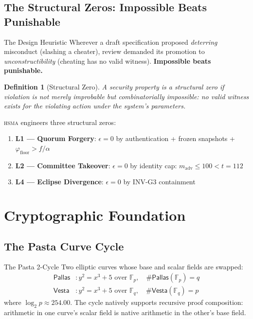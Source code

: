 \documentclass[11pt, a4paper]{article}
\newtheorem{definition}{Definition}
\newcommand{\hsma}{\textsc{hsma}}
\begin{document}
\subsection{The Structural Zeros: Impossible Beats Punishable}

\begin{keybox}{The Design Heuristic}
Wherever a draft specification proposed \emph{deterring} misconduct
(slashing a cheater), review demanded its promotion to
\emph{unconstructibility} (cheating has no valid witness).
\textbf{Impossible beats punishable.}
\end{keybox}

\begin{definition}[Structural Zero]
A security property is a \emph{structural zero} if violation is not
merely improbable but \emph{combinatorially impossible}: no valid
witness exists for the violating action under the system's parameters.
\end{definition}

\hsma{} engineers three structural zeros:
\begin{enumerate}
\item \textbf{L1 — Quorum Forgery}: $\epsilon = 0$ by authentication + frozen snapshots + $\varphi_{\text{floor}} > f/\alpha$ \item \textbf{L2 — Committee Takeover}: $\epsilon = 0$ by identity cap: $m_{\text{adv}} \le 100 < t = 112$ \item \textbf{L4 — Eclipse Divergence}: $\epsilon = 0$ by INV-G3 containment
\end{enumerate}

\section{Cryptographic Foundation}
\label{sec:foundation}

\subsection{The Pasta Curve Cycle}

\begin{defnbox}{The Pasta 2-Cycle}
Two elliptic curves whose base and scalar fields are swapped:
\begin{align}
\textsf{Pallas}&: y^2 = x^3 + 5 \text{ over } \mathbb{F}_p, \quad
\#\textsf{Pallas}(\mathbb{F}_p) = q\\
\textsf{Vesta}&: y^2 = x^3 + 5 \text{ over } \mathbb{F}_q, \quad
\#\textsf{Vesta}(\mathbb{F}_q) = p
\end{align}
where $\log_2 p \approx 254.00$. The cycle natively supports recursive
proof composition: arithmetic in one curve's scalar field is native
arithmetic in the other's base field.
\end{defnbox}
\end{document}
